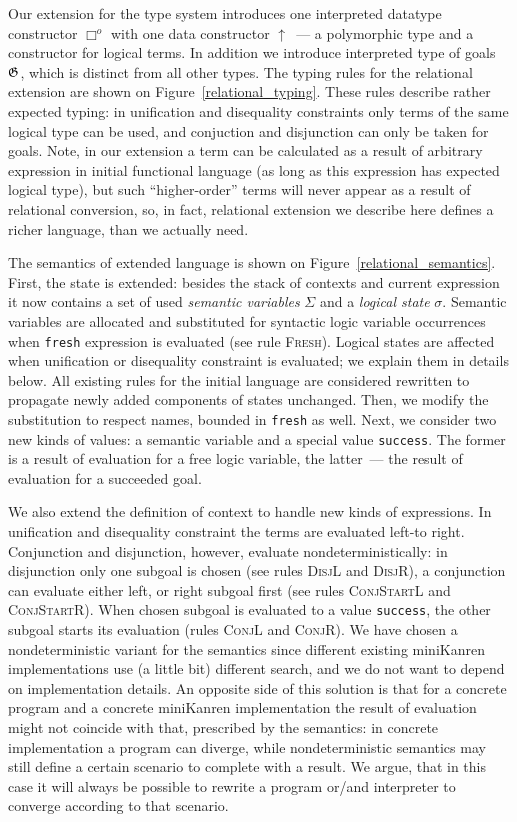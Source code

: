 Our extension for the type system introduces one interpreted datatype constructor $\Box^o$ with one data constructor $\uparrow$~--- a polymorphic type and
a constructor for logical terms. In addition we introduce interpreted type of goals $\mathfrak G$, which is distinct from all other types. The typing rules for the relational 
extension are shown on Figure~\ref{relational_typing}. These rules describe rather expected typing: in unification and disequality constraints only
terms of the same logical type can be used, and conjuction and disjunction can only be taken for goals. Note, in our extension a term can be calculated as
a result of arbitrary expression in initial functional language (as long as this expression has expected logical type), but such ``higher-order'' terms will
never appear as a result of relational conversion, so, in fact, relational extension we describe here defines a richer language, than we actually need.

The semantics of extended language is shown on Figure~\ref{relational_semantics}. First, the state is extended: besides the stack of contexts and
current expression it now contains a set of used \emph{semantic variables} $\Sigma$ and a \emph{logical state} $\sigma$. 
Semantic variables are allocated and substituted for syntactic logic variable occurrences when \lstinline|fresh| expression is evaluated 
(see rule \textsc{Fresh}). Logical states are affected when unification or disequality constraint is evaluated; we explain them
in details below. All existing rules for the initial language are considered rewritten to propagate newly added components of states unchanged.
Then, we modify the substitution to respect names, bounded in \lstinline|fresh| as well. 
Next, we consider two new kinds of values: a semantic variable and a special value \lstinline|success|. The former is a result of evaluation for
a free logic variable, the latter~--- the result of evaluation for a succeeded goal.

We also extend the definition of context to handle new kinds of expressions. In unification and disequality constraint the terms are evaluated left-to right.
Conjunction and disjunction, however, evaluate nondeterministically: in disjunction only one subgoal is chosen (see rules \textsc{DisjL} and \textsc{DisjR}),
a conjunction can evaluate either left, or right subgoal first (see rules \textsc{ConjStartL} and \textsc{ConjStartR}). When chosen subgoal is evaluated
to a value \lstinline|success|, the other subgoal starts its evaluation (rules \textsc{ConjL} and \textsc{ConjR}).
We have chosen a nondeterministic variant for the semantics since different existing miniKanren implementations use (a little bit) different search, and we do 
not want to depend on implementation details. An opposite side of this solution is that for a concrete program and a concrete miniKanren implementation 
the result of evaluation might not coincide with that, prescribed by the semantics: in concrete implementation a program can diverge, while
nondeterministic semantics may still define a certain scenario to complete with a result. We argue, that in this case it will always be possible to
rewrite a program or/and interpreter to converge according to that scenario.


